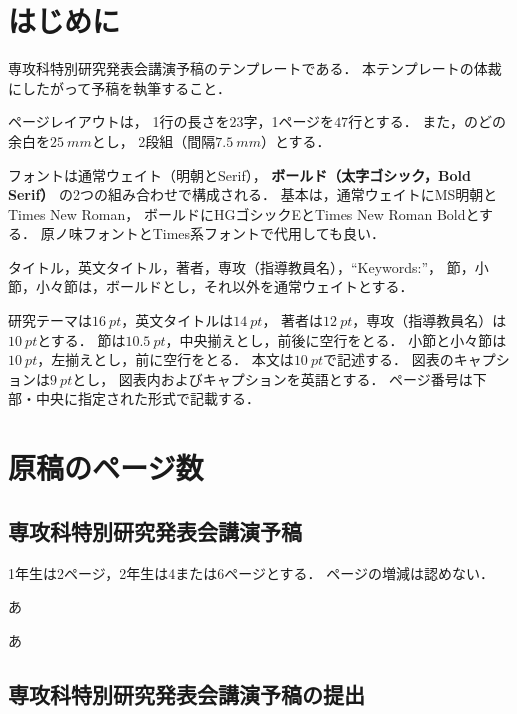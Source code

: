 \documentclass[
	fonts=word
	\ifdefined\kanjiskip , dvipdfmx \fi
]{ac-resume}
\begin{document}
\color{red}
\maketitle

\section{はじめに}

専攻科特別研究発表会講演予稿のテンプレートである．
本テンプレートの体裁にしたがって予稿を執筆すること．

ページレイアウトは，
1行の長さを$23$字，1ページを$47$行とする．
また，のどの余白を$\SI{25}{mm}$とし，
2段組（間隔$\SI{7.5}{mm}$）とする．

フォントは通常ウェイト（明朝とSerif），
\textbf{ボールド（太字ゴシック，Bold Serif）}
の2つの組み合わせで構成される．
基本は，通常ウェイトにMS明朝とTimes New Roman，
ボールドにHGゴシックEとTimes New Roman Boldとする．
原ノ味フォントとTimes系フォントで代用しても良い．

タイトル，英文タイトル，著者，専攻（指導教員名），``Keywords:''，
節，小節，小々節は，ボールドとし，それ以外を通常ウェイトとする．

研究テーマは$\SI{16}{pt}$，英文タイトルは$\SI{14}{pt}$，
著者は$\SI{12}{pt}$，専攻（指導教員名）は$\SI{10}{pt}$とする．
節は$\SI{10.5}{pt}$，中央揃えとし，前後に空行をとる．
小節と小々節は$\SI{10}{pt}$，左揃えとし，前に空行をとる．
本文は$\SI{10}{pt}$で記述する．
図表のキャプションは$\SI{9}{pt}$とし，
図表内およびキャプションを英語とする．
ページ番号は下部・中央に指定された形式で記載する．

\section{原稿のページ数}

\subsection{専攻科特別研究発表会講演予稿}

1年生は2ページ，2年生は4または6ページとする．
ページの増減は認めない．

あ

あ

\subsection{専攻科特別研究発表会講演予稿の提出}
\end{document}
